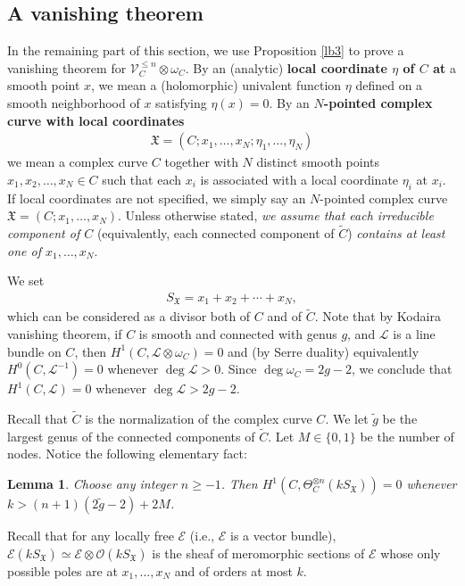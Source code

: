 \documentclass[12pt,a4paper,notitlepage]{article}
\theoremstyle{definition}
\theoremstyle{plain}
\newtheorem{lm}[df]{Lemma}
\newcommand{\fk}{\mathfrak}
\newcommand{\wtd}{\widetilde}
\newcommand{\scr}{\mathscr}
\newcommand{\SX}{S_{\fk X}}
\newcommand{\blt}{\bullet}
\numberwithin{equation}{section}
\begin{document}
\subsection*{A vanishing theorem}



In the remaining part of this section, we use Proposition \ref{lb3} to prove a vanishing theorem for $\scr V_C^{\leq n}\otimes\omega_C$. By an (analytic) \textbf{local coordinate $\eta$ of $C$ at} a smooth point $x$, we mean  a (holomorphic) univalent function $\eta$ defined on a smooth neighborhood of $x$ satisfying $\eta(x)=0$. By an \textbf{$N$-pointed complex curve with local coordinates}
\begin{align*}
\fk X=(C;x_1,\dots,x_N;\eta_1,\dots,\eta_N)
\end{align*}
we mean a complex curve $C$ together with $N$ distinct smooth points $x_1,x_2,\dots,x_N\in C$ such that each $x_i$ is associated with a local coordinate $\eta_i$ at $x_i$. If local coordinates are not specified, we simply say an $N$-pointed complex curve $\fk X=(C;x_1,\dots,x_N)$. Unless otherwise stated, \emph{we assume that each irreducible component of $C$} (equivalently, each connected component of $\wtd C$) \emph{contains at least one of $x_1,\dots,x_N$}. 

We set \index{SX@$\SX,\SX(b)$}
\begin{align*}
\SX=x_1+x_2+\cdots+x_N,
\end{align*}
which can be considered as a divisor both of $C$ and of $\wtd C$. Note that by Kodaira vanishing theorem, if $C$ is smooth and connected with genus $g$, and $\scr L$ is a line bundle on $C$, then $H^1(C,\scr L\otimes\omega_C)=0$ and (by Serre duality) equivalently  $H^0(C,\scr L^{-1})=0$ whenever $\deg\scr L>0$. Since $\deg\omega_C=2g-2$, we conclude that $H^1(C,\scr L)=0$ whenever $\deg\scr L>2g-2$.


Recall that $\wtd C$ is the normalization of the complex curve $C$. We let $\wtd g$ be the largest genus of the connected components of $\wtd C$. Let $M\in\{0,1\}$ be the number of nodes. Notice the following elementary fact:

\begin{lm}\label{lb4}
Choose any integer $n\geq -1$. Then $H^1(C,\Theta_C^{\otimes n}(k\SX))=0$ whenever  $k>(n+1)(2\wtd g-2)+2M$.
\end{lm} 

Recall that for any locally free $\scr E$ (i.e., $\scr E$ is a vector bundle), \index{SX@$k\SX,\blt\SX$} $\scr E(k\SX)\simeq\scr E\otimes\scr O(k\SX)$ is the sheaf of meromorphic sections of $\scr E$ whose only possible poles are at $x_1,\dots,x_N$ and of orders at most $k$. 
\end{document}
